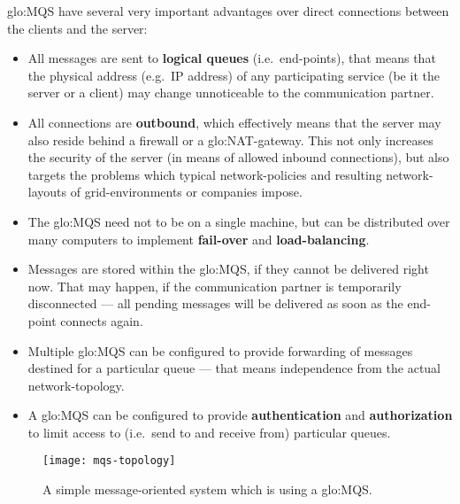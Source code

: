 \gls{glo:MQS}   have  several  very   important  advantages   over  direct
connections between the clients and the server:

\begin{itemize}
\item All messages are  sent to \textbf{logical queues} (i.e.~end-points),
  that  means   that  the  physical  address  (e.g.~IP   address)  of  any
  participating  service  (be  it  the  server or  a  client)  may  change
  unnoticeable to the communication partner.
\item All connections are  \textbf{outbound}, which effectively means that
  the server may also reside behind a firewall or a \gls{glo:NAT}-gateway.
  This not only increases the security  of the server (in means of allowed
  inbound  connections),  but  also  targets the  problems  which  typical
  network-policies and  resulting network-layouts of  grid-environments or
  companies impose.
\item The  \gls{glo:MQS} need not  to be on  a single machine, but  can be
  distributed  over  many computers  to  implement \textbf{fail-over}  and
  \textbf{load-balancing}.
\item  Messages are  stored within  the \gls{glo:MQS},  if they  cannot be
  delivered right now.   That may happen, if the  communication partner is
  temporarily disconnected  --- all pending messages will  be delivered as
  soon as the end-point connects again.
\item Multiple  \gls{glo:MQS} can be  configured to provide  forwarding of
  messages  destined for a  particular queue  --- that  means independence
  from the actual network-topology.
\item A \gls{glo:MQS} can be configured to provide \textbf{authentication}
  and \textbf{authorization} to limit  access to (i.e.~send to and receive
  from) particular queues.
\end{itemize}

\begin{figure}[htbp]
  \begin{center}
    \begin{minipage}{.75\textwidth}
      \begin{center}
        \texttt{[image: mqs-topology]}
      \end{center}
      \caption[Example MQS topology]{A simple message-oriented system
        which is using a \gls{glo:MQS}.}
      \label{fig:mqs-topology}
    \end{minipage}
  \end{center}
\end{figure}

